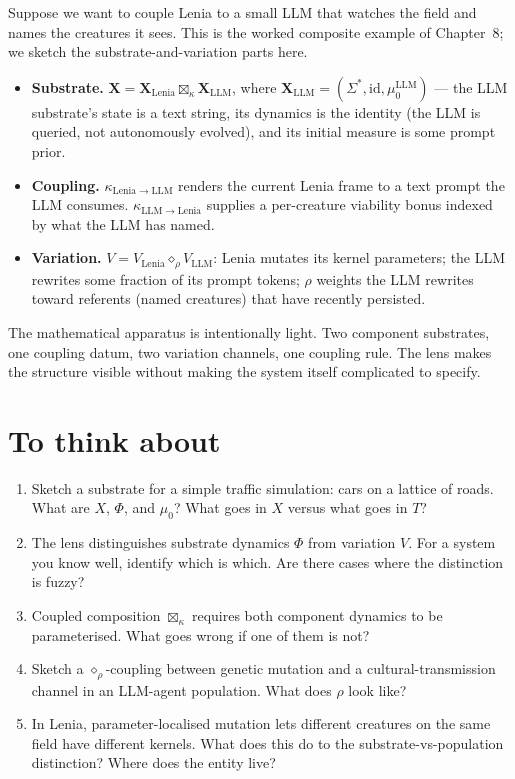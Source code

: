 Suppose we want to couple Lenia to a small LLM that watches the field
and names the creatures it sees. This is the worked composite example
of Chapter~8; we sketch the substrate-and-variation parts here.

\begin{itemize}[leftmargin=1.5em,itemsep=2pt]
  \item \textbf{Substrate.} $\mathbf{X} = \mathbf{X}_{\mathrm{Lenia}}
    \boxtimes_\kappa \mathbf{X}_{\mathrm{LLM}}$, where
    $\mathbf{X}_{\mathrm{LLM}} = (\Sigma^*, \mathrm{id},
    \mu_0^{\mathrm{LLM}})$ --- the LLM substrate's state is a text
    string, its dynamics is the identity (the LLM is queried, not
    autonomously evolved), and its initial measure is some prompt
    prior.
  \item \textbf{Coupling.} $\kappa_{\mathrm{Lenia} \to \mathrm{LLM}}$
    renders the current Lenia frame to a text prompt the LLM consumes.
    $\kappa_{\mathrm{LLM} \to \mathrm{Lenia}}$ supplies a per-creature
    viability bonus indexed by what the LLM has named.
  \item \textbf{Variation.} $V = V_{\mathrm{Lenia}} \diamond_\rho
    V_{\mathrm{LLM}}$: Lenia mutates its kernel parameters; the LLM
    rewrites some fraction of its prompt tokens; $\rho$ weights the
    LLM rewrites toward referents (named creatures) that have recently
    persisted.
\end{itemize}

The mathematical apparatus is intentionally light. Two component
substrates, one coupling datum, two variation channels, one coupling
rule. The lens makes the structure visible without making the system
itself complicated to specify.

\section*{To think about}

\begin{enumerate}
  \item Sketch a substrate for a simple traffic simulation: cars on a
    lattice of roads. What are $X$, $\Phi$, and $\mu_0$? What goes in
    $X$ versus what goes in $T$?
  \item The lens distinguishes substrate dynamics $\Phi$ from variation
    $V$. For a system you know well, identify which is which. Are
    there cases where the distinction is fuzzy?
  \item Coupled composition $\boxtimes_\kappa$ requires both component
    dynamics to be parameterised. What goes wrong if one of them is
    not?
  \item Sketch a $\diamond_\rho$-coupling between genetic mutation and
    a cultural-transmission channel in an LLM-agent population. What
    does $\rho$ look like?
  \item In Lenia, parameter-localised mutation lets different creatures
    on the same field have different kernels. What does this do to the
    substrate-vs-population distinction? Where does the entity live?
\end{enumerate}
